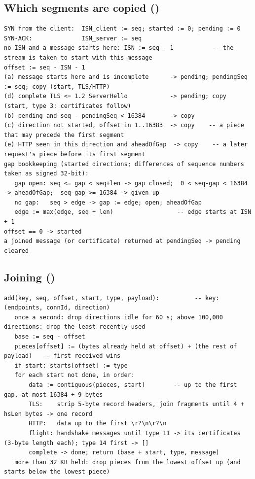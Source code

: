 \subsection{Which segments are copied ()}
\begin{Verbatim}
SYN from the client:  ISN_client := seq; started := 0; pending := 0
SYN-ACK:              ISN_server := seq
no ISN and a message starts here: ISN := seq - 1           -- the stream is taken to start with this message
offset := seq - ISN - 1
(a) message starts here and is incomplete      -> pending; pendingSeq := seq; copy (start, TLS/HTTP)
(d) complete TLS <= 1.2 ServerHello            -> pending; copy (start, type 3: certificates follow)
(b) pending and seq - pendingSeq < 16384       -> copy
(c) direction not started, offset in 1..16383  -> copy    -- a piece that may precede the first segment
(e) HTTP seen in this direction and aheadOfGap  -> copy    -- a later request's piece before its first segment
gap bookkeeping (started directions; differences of sequence numbers taken as signed 32-bit):
   gap open: seq <= gap < seq+len -> gap closed;  0 < seq-gap < 16384 -> aheadOfGap;  seq-gap >= 16384 -> given up
   no gap:   seq > edge -> gap := edge; open; aheadOfGap
   edge := max(edge, seq + len)                  -- edge starts at ISN + 1
offset == 0 -> started
a joined message (or certificate) returned at pendingSeq -> pending cleared
\end{Verbatim}

\subsection{Joining ()}
\begin{Verbatim}
add(key, seq, offset, start, type, payload):          -- key: (endpoints, connId, direction)
   once a second: drop directions idle for 60 s; above 100,000 directions: drop the least recently used
   base := seq - offset
   pieces[offset] := (bytes already held at offset) + (the rest of payload)   -- first received wins
   if start: starts[offset] := type
   for each start not done, in order:
       data := contiguous(pieces, start)        -- up to the first gap, at most 16384 + 9 bytes
       TLS:    strip 5-byte record headers, join fragments until 4 + hsLen bytes -> one record
       HTTP:   data up to the first \r?\n\r?\n
       flight: handshake messages until type 11 -> its certificates (3-byte length each); type 14 first -> []
       complete -> done; return (base + start, type, message)
   more than 32 KB held: drop pieces from the lowest offset up (and starts below the lowest piece)
\end{Verbatim}

